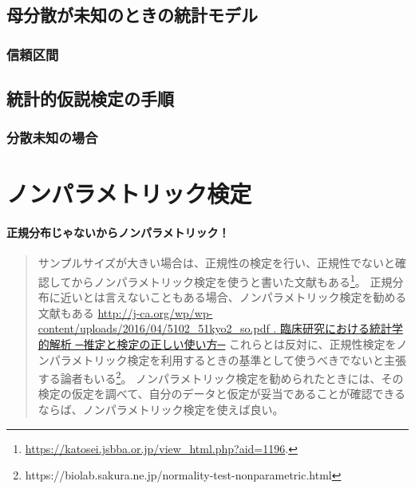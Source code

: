 \documentclass[a4paper,11pt,dvipdfmx]{jsarticle}
\begin{document}
\subsection{母分散が未知のときの統計モデル}


\subsubsection{信頼区間}


\subsection{統計的仮説検定の手順}



\subsubsection{分散未知の場合}



\section{ノンパラメトリック検定}
\begin{mybox}
    \paragraph{正規分布じゃないからノンパラメトリック！}
    \begin{quote}
        サンプルサイズが大きい場合は、正規性の検定を行い、正規性でないと確認してからノンパラメトリック検定を使うと書いた文献もある\footnote{\url{https://katosei.jsbba.or.jp/view_html.php?aid=1196}.}。
        正規分布に近いとは言えないこともある場合、ノンパラメトリック検定を勧める文献もある \url{ http://j-ca.org/wp/wp-content/uploads/2016/04/5102_51kyo2_so.pdf . 臨床研究における統計学的解析 ─推定と検定の正しい使い方─}
        これらとは反対に、正規性検定をノンパラメトリック検定を利用するときの基準として使うべきでないと主張する論者もいる\footnote{https://biolab.sakura.ne.jp/normality-test-nonparametric.html}。
        ノンパラメトリック検定を勧められたときには、その検定の仮定を調べて、自分のデータと仮定が妥当であることが確認できるならば、ノンパラメトリック検定を使えば良い。
    \end{quote}
\end{mybox}
\end{document}
